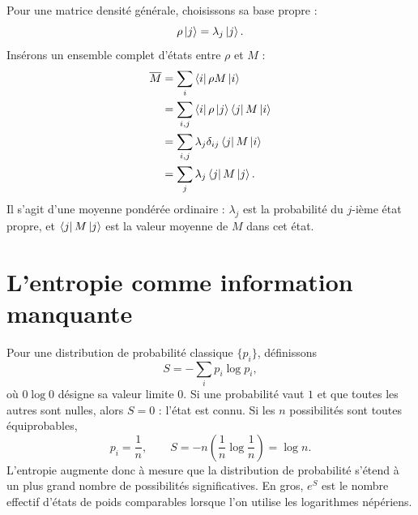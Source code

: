 Pour une matrice densité générale, choisissons sa base propre :
\begin{equation}
\rho\left\lvert j\right\rangle=\lambda_j\left\lvert j\right\rangle.
\end{equation}
Insérons un ensemble complet d’états entre \(\rho\) et \(M\) :
\begin{align}
\overline{M}
&=\sum_i\left\langle i\right\rvert\rho M\left\lvert i\right\rangle \\
&=\sum_{i,j}\left\langle i\right\rvert\rho\left\lvert j\right\rangle\left\langle j\right\rvert M\left\lvert i\right\rangle \\
&=\sum_{i,j}\lambda_j\delta_{ij}\left\langle j\right\rvert M\left\lvert i\right\rangle \\
&=\sum_j\lambda_j\left\langle j\right\rvert M\left\lvert j\right\rangle.
\end{align}
Il s’agit d’une moyenne pondérée ordinaire : \(\lambda_j\) est la probabilité du \(j\)-ième état propre, et \(\left\langle j\right\rvert M\left\lvert j\right\rangle\) est la valeur moyenne de \(M\) dans cet état.

\begin{classroomqa}
\end{classroomqa}

\section{L’entropie comme information manquante}

Pour une distribution de probabilité classique \(\{p_i\}\), définissons
\begin{equation}
S=-\sum_i p_i\log p_i,
\end{equation}
où \(0\log 0\) désigne sa valeur limite \(0\). Si une probabilité vaut \(1\) et que toutes les autres sont nulles, alors \(S=0\) : l’état est connu. Si les \(n\) possibilités sont toutes équiprobables,
\begin{equation}
p_i=\frac{1}{n},
\qquad
S=-n\left(\frac{1}{n}\log\frac{1}{n}\right)=\log n.
\end{equation}
L’entropie augmente donc à mesure que la distribution de probabilité s’étend à un plus grand nombre de possibilités significatives. En gros, \(e^S\) est le nombre effectif d’états de poids comparables lorsque l’on utilise les logarithmes népériens.

